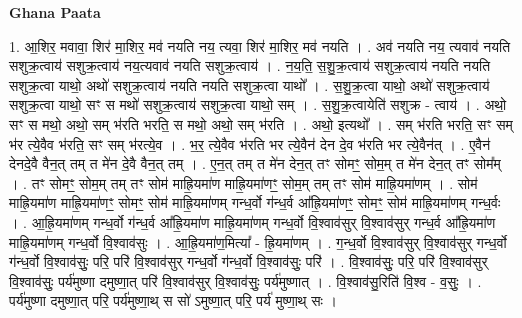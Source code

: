 \documentclass[17pt]{extarticle}
\begin{document}
\textbf{Ghana Paata } \newline

1. आ॒शिर॒ मवावा॒ शिर॑ मा॒शिर॒ मव॑ नयति नय॒ त्यवा॒ शिर॑ मा॒शिर॒ मव॑ नयति । . अव॑ नयति नय॒ त्यवाव॑ नयति सशुक्र॒त्वाय॑ सशुक्र॒त्वाय॑ नय॒त्यवाव॑ नयति सशुक्र॒त्वाय॑ । . न॒य॒ति॒ स॒शु॒क्र॒त्वाय॑ सशुक्र॒त्वाय॑ नयति नयति सशुक्र॒त्वा याथो॒ अथो॑ सशुक्र॒त्वाय॑ नयति नयति सशुक्र॒त्वा याथो᳚ । . स॒शु॒क्र॒त्वा याथो॒ अथो॑ सशुक्र॒त्वाय॑ सशुक्र॒त्वा याथो॒ सꣳ स मथो॑ सशुक्र॒त्वाय॑ सशुक्र॒त्वा याथो॒ सम् । . स॒शु॒क्र॒त्वायेति॑ सशुक्र - त्वाय॑ । . अथो॒ सꣳ स मथो॒ अथो॒ सम् भ॑रति भरति॒ स मथो॒ अथो॒ सम् भ॑रति । . अथो॒ इत्यथो᳚ । . सम् भ॑रति भरति॒ सꣳ सम् भ॑र त्ये॒वैव भ॑रति॒ सꣳ सम् भ॑रत्ये॒व । . भ॒र॒ त्ये॒वैव भ॑रति भर त्ये॒वैन॑ देन दे॒व भ॑रति भर त्ये॒वैन॑त् । . ए॒वैन॑ देनदे॒वै वैन॒त् तम् त मे॑न दे॒वै वैन॒त् तम् । . ए॒न॒त् तम् त मे॑न देन॒त् तꣳ सोमꣳ॒॒ सोम॒म् त मे॑न देन॒त् तꣳ सोम᳚म् । . तꣳ सोमꣳ॒॒ सोम॒म् तम् तꣳ सोम॑ माह्रि॒यमा॑ण माह्रि॒यमा॑णꣳ॒॒ सोम॒म् तम् तꣳ सोम॑ माह्रि॒यमा॑णम् । . सोम॑ माह्रि॒यमा॑ण माह्रि॒यमा॑णꣳ॒॒ सोमꣳ॒॒ सोम॑ माह्रि॒यमा॑णम् गन्ध॒र्वो ग॑न्ध॒र्व आ᳚ह्रि॒यमा॑णꣳ॒॒ सोमꣳ॒॒ सोम॑ माह्रि॒यमा॑णम् गन्ध॒र्वः । . आ॒ह्रि॒यमा॑णम् गन्ध॒र्वो ग॑न्ध॒र्व आ᳚ह्रि॒यमा॑ण माह्रि॒यमा॑णम् गन्ध॒र्वो वि॒श्वाव॑सुर् वि॒श्वाव॑सुर् गन्ध॒र्व आ᳚ह्रि॒यमा॑ण माह्रि॒यमा॑णम् गन्ध॒र्वो वि॒श्वाव॑सुः । . आ॒ह्रि॒यमा॑ण॒मित्या᳚ - ह्रि॒यमा॑णम् । . ग॒न्ध॒र्वो वि॒श्वाव॑सुर् वि॒श्वाव॑सुर् गन्ध॒र्वो ग॑न्ध॒र्वो वि॒श्वाव॑सुः॒ परि॒ परि॑ वि॒श्वाव॑सुर् गन्ध॒र्वो ग॑न्ध॒र्वो वि॒श्वाव॑सुः॒ परि॑ । . वि॒श्वाव॑सुः॒ परि॒ परि॑ वि॒श्वाव॑सुर् वि॒श्वाव॑सुः॒ पर्य॑मुष्णा दमुष्णा॒त् परि॑ वि॒श्वाव॑सुर् वि॒श्वाव॑सुः॒ पर्य॑मुष्णात् । . वि॒श्वाव॑सु॒रिति॑ वि॒श्व - व॒सुः॒ । . पर्य॑मुष्णा दमुष्णा॒त् परि॒ पर्य॑मुष्णा॒थ् स सो॑ ऽमुष्णा॒त् परि॒ पर्य॑ मुष्णा॒थ् सः । \newline
\end{document}
